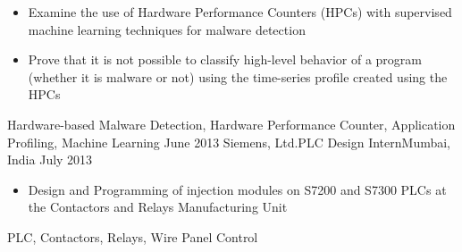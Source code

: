 \begin{experiences}
{                      \begin{itemize}
                        \item Examine the use of Hardware Performance Counters (HPCs) with supervised machine learning techniques for malware detection
                        \item Prove that it is not possible to classify high-level behavior of a program (whether it is malware or not) using the time-series profile created using the HPCs \\
                      \end{itemize}
                    }
                    {Hardware-based Malware Detection, Hardware Performance Counter, Application Profiling, Machine Learning}
  \emptySeparator
  \experience
    {June 2013}     {Siemens, Ltd.}{PLC Design Intern}{Mumbai, India}
    {July 2013}    {
                      \begin{itemize}
                        \item Design and Programming of injection modules on S7200 and S7300 PLCs at the Contactors and Relays Manufacturing Unit \\
                      \end{itemize}
                    }
                    {PLC, Contactors, Relays, Wire Panel Control}
\end{experiences}
